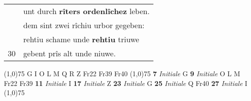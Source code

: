 \documentclass[8pt,a4paper,notitlepage]{article}
\begin{document}
\begin{table}[ht]
\begin{minipage}[t]{0.5\linewidth}
\begin{tabular}{rl}
 & unt durch \textbf{rîters ordenlîchez} leben.\\ 
 & dem sint zwei rîchiu urbor gegeben:\\ 
 & rehtiu schame unde \textbf{rehtiu} triuwe\\ 
30 & gebent prîs alt unde niuwe.\\ 
\end{tabular}
\scriptsize
\line(1,0){75} \newline
G I O L M Q R Z Fr22 Fr39 Fr40 \newline
\line(1,0){75} \newline
\textbf{7} \textit{Initiale} G  \textbf{9} \textit{Initiale} O L M Fr22 Fr39  \textbf{11} \textit{Initiale} I  \textbf{17} \textit{Initiale} Z  \textbf{23} \textit{Initiale} G  \textbf{25} \textit{Initiale} Q Fr40  \textbf{27} \textit{Initiale} I  \newline
\line(1,0){75} \newline

\end{minipage}
\end{table}
\end{document}

